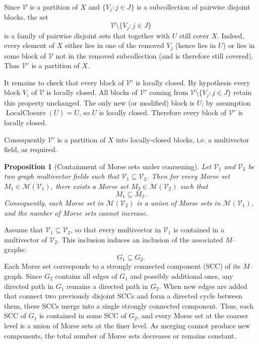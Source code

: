 \documentclass{article}
\theoremstyle{definition}
\theoremstyle{plain}
\newtheorem{proposition}{Proposition}
\theoremstyle{remark}
\newcommand{\1}{\mathbbm{1}}  %
\renewenvironment{proof}{{\bf Proof:\ }}{\qedsymbol}%
\begin{document}
\begin{proof}
Since $\mathcal V$ is a partition of $X$ and $\{V_j:j\in J\}$ is a subcollection
of pairwise disjoint blocks, the set
\[
\mathcal V\setminus\{V_j:j\in J\}
\]
is a family of pairwise disjoint sets that together with $U$ still cover $X$.
Indeed, every element of $X$ either lies in one of the removed $V_j$ (hence
lies in $U$) or lies in some block of $\mathcal V$ not in the removed
subcollection (and is therefore still covered). Thus $\mathcal V'$ is a
partition of $X$.

It remains to check that every block of $\mathcal V'$ is locally closed.
By hypothesis every block $V_i$ of $\mathcal V$ is locally closed. All
blocks of $\mathcal V'$ coming from $\mathcal V\setminus\{V_j:j\in J\}$
retain this property unchanged. The only new (or modified) block is $U$;
by assumption $\operatorname{LocalClosure}(U)=U$, so $U$ is locally closed.
Therefore every block of $\mathcal V'$ is locally closed.

Consequently $\mathcal V'$ is a partition of $X$ into locally-closed blocks,
i.e. a multivector field, as required.
\end{proof}
\begin{proposition}[Containment of Morse sets under coarsening]
\label{prop:morse-coarsening}
Let $\mathcal V_{1}$ and $\mathcal V_{2}$ be two graph multivector fields 
such that $\mathcal V_{1} \subseteq \mathcal V_{2}$. 
Then for every Morse set $M_1 \in \mathcal M(\mathcal V_{1})$, 
there exists a Morse set $M_2 \in \mathcal M(\mathcal V_{2})$ such that
\[
M_1 \subseteq M_2.
\]
Consequently, each Morse set in $\mathcal M(\mathcal V_{2})$ is a union of Morse sets 
in $\mathcal M(\mathcal V_{1})$, and the number of Morse sets cannot increase.
\end{proposition}

\begin{proof}
Assume that $\mathcal V_{1} \subseteq \mathcal V_{2}$, 
so that every multivector in $\mathcal V_{1}$ is contained in a multivector of 
$\mathcal V_{2}$.  
This inclusion induces an inclusion of the associated $M$--graphs:
\[
G_{1} \subseteq G_{2}.
\]
Each Morse set corresponds to a strongly connected component (SCC) of its $M$--graph. 
Since $G_{2}$ contains all edges of $G_{1}$ and possibly additional ones, 
any directed path in $G_{1}$ remains a directed path in $G_{2}$. 
When new edges are added that connect two previously disjoint SCCs and form a directed cycle 
between them, these SCCs merge into a single strongly connected component.  
Thus, each SCC of $G_{1}$ is contained in some SCC of $G_{2}$, 
and every Morse set at the coarser level is a union of Morse sets at the finer level.  
As merging cannot produce new components, the total number of Morse sets decreases or remains constant.
\end{proof}
\end{document}
